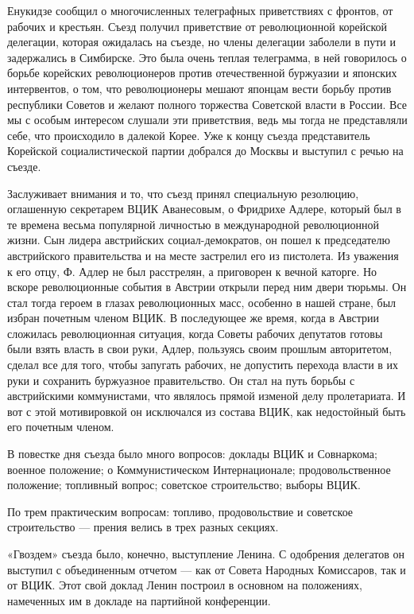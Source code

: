 \documentclass[12pt, a4paper, openany]{book}
\begin{document}
Енукидзе сообщил о многочисленных телеграфных приветствиях с фронтов, от рабочих и крестьян. Съезд получил приветствие от революционной корейской делегации, которая ожидалась на съезде, но члены делегации заболели в пути и задержались в Симбирске. Это была очень теплая телеграмма, в ней говорилось о борьбе корейских революционеров против отечественной буржуазии и японских интервентов, о том, что революционеры мешают японцам вести борьбу против республики Советов и желают полного торжества Советской власти в России. Все мы с особым интересом слушали эти приветствия, ведь мы тогда не представляли себе, что происходило в далекой Корее. Уже к концу съезда представитель Корейской социалистической партии добрался до Москвы и выступил с речью на съезде.

Заслуживает внимания и то, что съезд принял специальную резолюцию, оглашенную секретарем ВЦИК Аванесовым, о Фридрихе Адлере, который был в те времена весьма популярной личностью в международной революционной жизни. Сын лидера австрийских социал-демократов, он пошел к председателю австрийского правительства и на месте застрелил его из пистолета. Из уважения к его отцу, Ф. Адлер не был расстрелян, а приговорен к вечной каторге. Но вскоре революционные события в Австрии открыли перед ним двери тюрьмы. Он стал тогда героем в глазах революционных масс, особенно в нашей стране, был избран почетным членом ВЦИК. В последующее же время, когда в Австрии сложилась революционная ситуация, когда Советы рабочих депутатов готовы были взять власть в свои руки, Адлер, пользуясь своим прошлым авторитетом, сделал все для того, чтобы запугать рабочих, не допустить перехода власти в их руки и сохранить буржуазное правительство. Он стал на путь борьбы с австрийскими коммунистами, что являлось прямой изменой делу пролетариата. И вот с этой мотивировкой он исключался из состава ВЦИК, как недостойный быть его почетным членом.

В повестке дня съезда было много вопросов: доклады ВЦИК и Совнаркома; военное положение; о Коммунистическом Интернационале; продовольственное положение; топливный вопрос; советское строительство; выборы ВЦИК.

По трем практическим вопросам: топливо, продовольствие и советское строительство — прения велись в трех разных секциях.

«Гвоздем» съезда было, конечно, выступление Ленина. С одобрения делегатов он выступил с объединенным отчетом — как от Совета Народных Комиссаров, так и от ВЦИК. Этот свой доклад Ленин построил в основном на положениях, намеченных им в докладе на партийной конференции.
\end{document}
